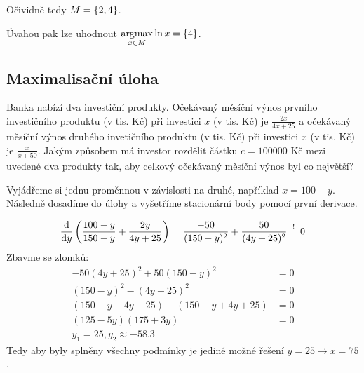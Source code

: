 \begin{multicols}{2}
\columnbreak

      \quad Očividně tedy $M = \left\lbrace 2,4 \right\rbrace$.

      \quad Úvahou pak lze uhodnout $\underset{x \in M}{\operatorname*{argmax}} \ln x = \left\lbrace 4 \right\rbrace$.
\end{multicols}

\subsection{Maximalisační úloha}
Banka nabízí dva investiční produkty. Očekávaný měsíční výnos prvního investičního produktu (v tis. Kč) při investici $x$
(v tis. Kč) je $\frac{2x}{4x+25}$ a očekávaný měsíční výnos druhého invetičního produktu (v tis. Kč) při investici $x$
(v tis. Kč) je $\frac{x}{x+50}$. Jakým způsobem má investor rozdělit částku $c = 100000$ Kč mezi uvedené dva produkty tak,
aby celkový očekávaný měsíční výnos byl co největší?


Vyjádřeme si jednu proměnnou v závislosti na druhé, například $x = 100 - y$. Následně dosadíme do úlohy a vyšetříme
stacionární body pomocí první derivace.

\[
    \frac{\mathop{}\!\mathrm{d}}{\mathop{}\!\mathrm{d} y} \left(\frac{100-y}{150-y} + \frac{2y}{4y + 25}\right)= \frac{-50}{(150-y)^2} + \frac{50}{(4y + 25)^2}
    \stackrel{!}{=}0
\]
Zbavme se zlomků:
\begin{align*}
    -50(4y + 25)^2 + 50(150-y)^2 &= 0 \\
    (150-y)^2 - (4y + 25)^2 &= 0 \\
    (150-y -4y - 25) - (150-y + 4y + 25) &=0\\
    (125 - 5y) (175 + 3y) &=0 \\
    y_1 = 25, y_2 \approx -58.3
\end{align*}
Tedy aby byly splněny všechny podmínky je jediné možné řešení $y = 25 \rightarrow x = 75$.

